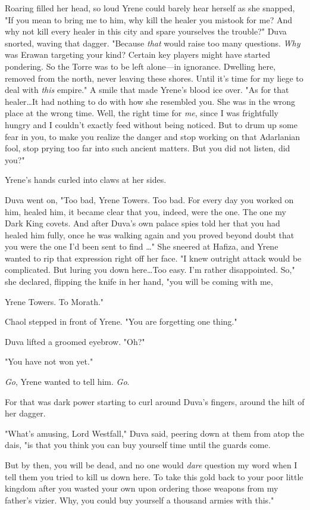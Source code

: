 Roaring filled her head, so loud Yrene could barely hear herself as she snapped, "If you mean to bring me to him, why kill the healer you mistook for me?
And why not kill every healer in this city and spare yourselves the trouble?"
Duva snorted, waving that dagger.
"Because \emph{that} would raise too many questions.
\emph{Why} was Erawan targeting your kind?
Certain key players might have started pondering.
So the Torre was to be left alone---in ignorance.
Dwelling here, removed from the north, never leaving these shores.
Until it's time for my liege to deal with \emph{this} empire."
A smile that made Yrene's blood ice over.
"As for that healer\ldots It had nothing to do with how she resembled you.
She was in the wrong place at the wrong time.
Well, the right time for \emph{me}, since I was frightfully hungry and I couldn't exactly feed without being noticed.
But to drum up some fear in you, to make you realize the danger and stop working on that Adarlanian fool, stop prying too far into such ancient matters.
But you did not listen, did you?"

Yrene's hands curled into claws at her sides.

Duva went on, "Too bad, Yrene Towers.
Too bad.
For every day you worked on him, healed him, it became clear that you, indeed, were the one.
The one my Dark King covets.
And after Duva's own palace spies told her that you had healed him fully, once he was walking again and you proved beyond doubt that you were the one I'd been sent to find \ldots" She sneered at Hafiza, and Yrene wanted to rip that expression right off her face.
"I knew outright attack would be complicated.
But luring you down here\ldots Too easy.
I'm rather disappointed.
So," she declared, flipping the knife in her hand, "you will be coming with me,

Yrene Towers.
To Morath."

Chaol stepped in front of Yrene.
"You are forgetting one thing."

Duva lifted a groomed eyebrow.
"Oh?"

"You have not won yet."

\emph{Go}, Yrene wanted to tell him.
\emph{Go}.

For that was dark power starting to curl around Duva's fingers, around the hilt of her dagger.

"What's amusing, Lord Westfall," Duva said, peering down at them from atop the dais, "is that you think you can buy yourself time until the guards come.

But by then, you will be dead, and no one would \emph{dare} question my word when I tell them you tried to kill us down here.
To take this gold back to your poor little kingdom after you wasted your own upon ordering those weapons from my father's vizier.
Why, you could buy yourself a thousand armies with this."

